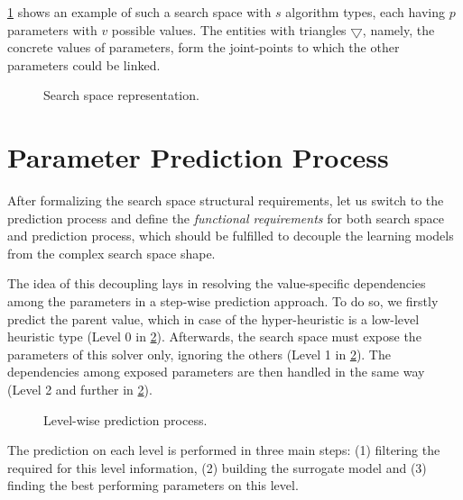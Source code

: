 \cref{concept:pict:Search Space Representation} shows an example of such a search space with $s$ algorithm types, each having $p$ parameters with $v$ possible values. The entities with triangles $\bigtriangledown$, namely, the concrete values of parameters, form the joint-points to which the other parameters could be linked. 

\begin{figure}[b]
	\centering
	
	\caption{Search space representation.}
	\label{concept:pict:Search Space Representation}
\end{figure}


\section{Parameter Prediction Process}\label{concept:prediction}
After formalizing the search space structural requirements, let us switch to the prediction process and define the  \emph{functional requirements} for both search space and prediction process, which should be fulfilled to decouple the learning models from the complex search space shape.

The idea of this decoupling lays in resolving the value-specific dependencies among the parameters in a step-wise prediction approach. To do so, we firstly predict the parent value, which in case of the hyper-heuristic is a low-level heuristic type (Level 0 in \cref{concept:pict:Level-wise prediction process}). Afterwards, the search space must expose the parameters of this solver only, ignoring the others (Level 1 in \cref{concept:pict:Level-wise prediction process}). The dependencies among exposed parameters are then handled in the same way (Level 2 and further in \cref{concept:pict:Level-wise prediction process}).

\begin{figure}[hbt]
	\centering
	
	\caption{Level-wise prediction process.}
	\label{concept:pict:Level-wise prediction process}
\end{figure}

The prediction on each level is performed in three main steps: (1) filtering the required for this level information, (2) building the surrogate model and (3) finding the best performing parameters on this level.

